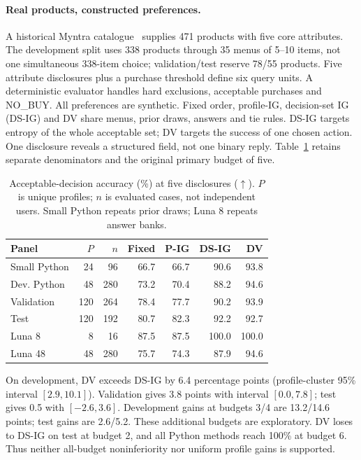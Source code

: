 \paragraph{Real products, constructed preferences.}
A historical Myntra catalogue~\cite{myntra} supplies 471 products with five core attributes. The development split uses 338 products through 35 menus of 5--10 items, not one simultaneous 338-item choice; validation/test reserve 78/55 products. Five attribute disclosures plus a purchase threshold define six query units. A deterministic evaluator handles hard exclusions, acceptable purchases and NO\_BUY. All preferences are synthetic. Fixed order, profile-IG, decision-set IG (DS-IG) and DV share menus, prior draws, answers and tie rules. DS-IG targets entropy of the whole acceptable set; DV targets the success of one chosen action. One disclosure reveals a structured field, not one binary reply. Table~\ref{tab:fashion} retains separate denominators and the original primary budget of five.

\begin{table}[t]
\caption{Acceptable-decision accuracy (\%) at five disclosures ($\uparrow$). $P$ is unique profiles; $n$ is evaluated cases, not independent users. Small Python repeats prior draws; Luna 8 repeats answer banks.}
\label{tab:fashion}
\centering
\setlength{\tabcolsep}{3.2pt}
\begin{tabular}{lrrrrrr}
\toprule
Panel & $P$ & $n$ & Fixed & P-IG & DS-IG & DV\\
\midrule
Small Python & 24 & 96 & 66.7 & 66.7 & 90.6 & 93.8\\
Dev. Python & 48 & 280 & 73.2 & 70.4 & 88.2 & 94.6\\
Validation & 120 & 264 & 78.4 & 77.7 & 90.2 & 93.9\\
Test & 120 & 192 & 80.7 & 82.3 & 92.2 & 92.7\\
Luna 8 & 8 & 16 & 87.5 & 87.5 & 100.0 & 100.0\\
Luna 48 & 48 & 280 & 75.7 & 74.3 & 87.9 & 94.6\\
\bottomrule
\end{tabular}
\end{table}

On development, DV exceeds DS-IG by 6.4 percentage points (profile-cluster 95\% interval $[2.9,10.1]$). Validation gives 3.8 points with interval $[0.0,7.8]$; test gives 0.5 with $[-2.6,3.6]$. Development gains at budgets 3/4 are 13.2/14.6 points; test gains are 2.6/5.2. These additional budgets are exploratory. DV loses to DS-IG on test at budget 2, and all Python methods reach 100\% at budget 6. Thus neither all-budget noninferiority nor uniform profile gains is supported.

